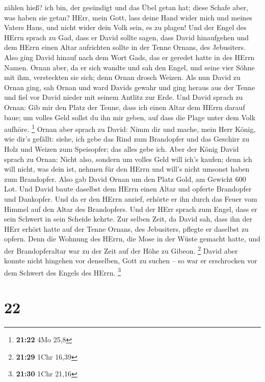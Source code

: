 zählen hieß? ich bin, der gesündigt und das Übel getan hat; diese Schafe
aber, was haben sie getan? HErr, mein Gott, lass deine Hand wider mich
und meines Vaters Haus, und nicht wider dein Volk sein, es zu plagen!
 Und der Engel des HErrn sprach zu Gad, dass er David
sollte sagen, dass David hinaufgehen und dem HErrn einen Altar
aufrichten sollte in der Tenne Ornans, des Jebusiters. 
Also ging David hinauf nach dem Wort Gads, das er geredet hatte in des
HErrn Namen.  Ornan aber, da er sich wandte und sah den
Engel, und seine vier Söhne mit ihm, versteckten sie sich; denn Ornan
drosch Weizen.  Als nun David zu Ornan ging, sah Ornan und
ward Davids gewahr und ging heraus aus der Tenne und fiel vor David
nieder mit seinem Antlitz zur Erde.  Und David sprach zu
Ornan: Gib mir den Platz der Tenne, dass ich einen Altar dem HErrn
darauf baue; um volles Geld sollst du ihn mir geben, auf dass die Plage
unter dem Volk aufhöre. \footnote{\textbf{21:22} 4Mo 25,8} 
Ornan aber sprach zu David: Nimm dir und mache, mein Herr König, wie
dir's gefällt: siehe, ich gebe das Rind zum Brandopfer und das Geschirr
zu Holz und Weizen zum Speisopfer; das alles gebe ich. 
Aber der König David sprach zu Ornan: Nicht also, sondern um volles Geld
will ich's kaufen; denn ich will nicht, was dein ist, nehmen für den
HErrn und will's nicht umsonst haben zum Brandopfer.  Also
gab David Ornan um den Platz Gold, am Gewicht 600 Lot.  Und
David baute daselbst dem HErrn einen Altar und opferte Brandopfer und
Dankopfer. Und da er den HErrn anrief, erhörte er ihn durch das Feuer
vom Himmel auf den Altar des Brandopfers.  Und der HErr
sprach zum Engel, dass er sein Schwert in sein Scheide kehrte.
 Zur selben Zeit, da David sah, dass ihn der HErr erhört
hatte auf der Tenne Ornans, des Jebusiters, pflegte er daselbst zu
opfern.  Denn die Wohnung des HErrn, die Mose in der Wüste
gemacht hatte, und der Brandopferaltar war zu der Zeit auf der Höhe zu
Gibeon. \footnote{\textbf{21:29} 1Chr 16,39}  David aber
konnte nicht hingehen vor denselben, Gott zu suchen -- so war er
erschrocken vor dem Schwert des Engels des HErrn. \footnote{\textbf{21:30}
  1Chr 21,16}

\hypertarget{section-4}{%
\section{22}\label{section-4}}

